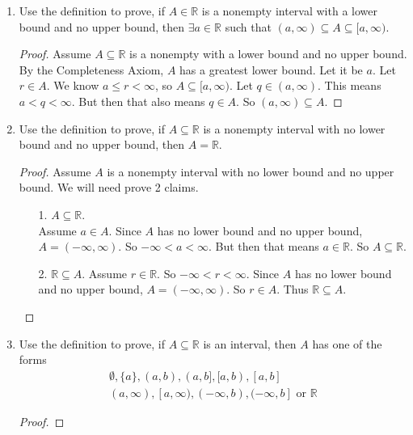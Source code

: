 \documentclass{article}
\theoremstyle{claim}
\theoremstyle{definition}
\begin{document}
\begin{enumerate}
\begin{enumerate}
            \item Use the definition to prove, if $A \in \mathbb{R}$ is a nonempty interval with a lower bound and no upper bound, then $\exists a \in \mathbb{R}$ such that $(a, \infty) \subseteq A \subseteq [a, \infty)$.
                \begin{proof}
                    Assume $A \subseteq \mathbb{R}$ is a nonempty with a lower bound and no upper bound. By the Completeness Axiom, $A$ has a greatest lower bound. Let it be $a$. Let $r \in A$. We know $a \le r < \infty$, so $A \subseteq [a, \infty)$. Let $q \in (a, \infty)$. This means $a < q < \infty$. But then that also means $q \in A$. So $(a, \infty) \subseteq A$.
                \end{proof}
            \item Use the definition to prove, if $A \subseteq \mathbb{R}$ is a nonempty interval with no lower bound and no upper bound, then $A = \mathbb{R}$.
                \begin{proof}
                    Assume $A$ is a nonempty interval with no lower bound and no upper bound. We will need prove 2 claims.
                    \begin{enumerate}
                        \item[1.] $A \subseteq \mathbb{R}$.\\
                            Assume $a \in A$. Since $A$ has no lower bound and no upper bound, $A = (-\infty, \infty)$. So $-\infty < a < \infty$. But then that means $a \in \mathbb{R}$. So $A \subseteq \mathbb{R}$.
                        \item[2.] $\mathbb{R} \subseteq A$.
                            Assume $r \in \mathbb{R}$. So $-\infty < r < \infty$. Since $A$ has no lower bound and no upper bound, $A = (-\infty, \infty)$. So $r \in A$. Thus $\mathbb{R} \subseteq A$.
                    \end{enumerate}
                \end{proof}
            \item Use the definition to prove, if $A \subseteq \mathbb{R}$ is an interval, then $A$ has one of the forms
            \begin{gather*}
                \emptyset, \{a \}, (a, b), (a, b], [a, b), [a, b]\\
                (a, \infty), [a, \infty), (- \infty, b), (- \infty, b] \text{ or } \mathbb{R}
            \end{gather*}
            \begin{proof}

\end{proof}
\end{enumerate}
\end{enumerate}
\end{document}

